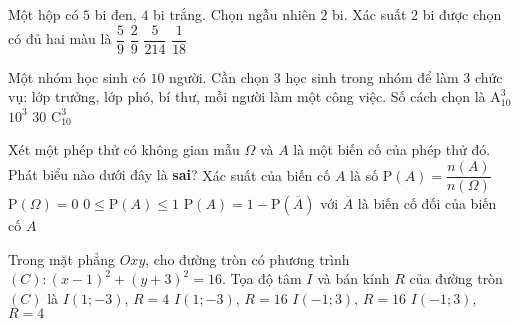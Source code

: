 	\begin{ex}%
		Một hộp có $5$ bi đen, $4$ bi trắng. Chọn ngẫu nhiên $2$ bi. Xác suất $2$ bi được chọn có đủ hai màu là
		\choice
		{\True $\dfrac{5}{9}$}
		{$\dfrac{2}{9}$}
		{$\dfrac{5}{214}$}
		{$\dfrac{1}{18}$}
	\end{ex}

	\begin{ex}%
		Một nhóm học sinh có $10$ người. Cần chọn $3$ học sinh trong nhóm để làm $3$ chức vụ: lớp trưởng, lớp phó, bí thư, mỗi người làm một công việc. Số cách chọn là
		\choice
		{\True $\mathrm{A}_{10}^3$}
		{$10^3$}
		{$30$}
		{$\mathrm{C}_{10}^3$}
	\end{ex}

	\begin{ex}%
		Xét một phép thử có không gian mẫu $\Omega$ và $A$ là một biến cố của phép thử đó. Phát biểu nào dưới đây là \textbf{sai}?
		\choice
		{Xác suất của biến cố $A$ là số $\mathrm{P}(A)=\dfrac{n(A)}{n(\Omega)}$}
		{\True $\mathrm{P}(\Omega)=0$}
		{$0 \leq \mathrm{P}(A) \leq 1$}
		{$\mathrm{P}(A)=1-\mathrm{P}(\overline{A})$ với $\overline{A}$ là biến cố đối của biến cố $A$}
	\end{ex}

	\begin{ex}%
		Trong mặt phẳng $Oxy$, cho đường tròn có phương trình $(C)\colon (x-1)^2+(y+3)^2=16$. Tọa độ tâm $I$ và bán kính $R$ của đường tròn $(C)$ là
		\choice
		{\True $I(1;-3)$, $R=4$}
		{$I(1;-3)$, $R=16$}
		{$I(-1;3)$, $R=16$}
		{$I(-1;3)$, $R=4$}
	\end{ex}

